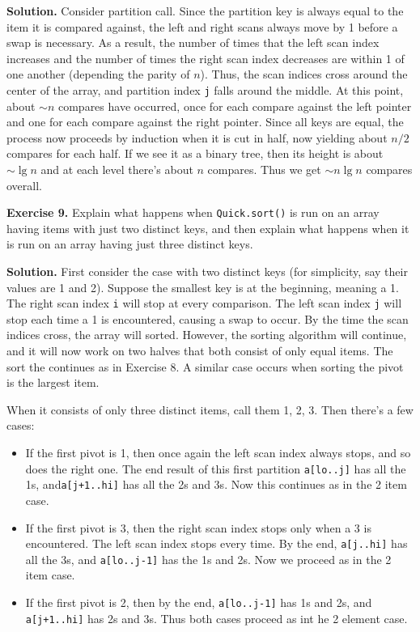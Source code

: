 \documentclass[12pt, a4paper]{article}
\newenvironment{ex}[2][Exercise]
{\par\medskip\noindent \textbf{#1 #2.}}
{\medskip}
\newenvironment{sol}[1][Solution]
{\par\medskip\noindent \textbf{#1.} }
{\medskip}
\begin{document}
	\begin{sol}
		Consider partition call. Since the partition key is always equal to the item
		it is compared against, the left and right scans always move by 1 before
		a swap is necessary. As a result, the number of times that the left scan
		index increases and the number of times the right scan index decreases are
		within 1 of one another (depending the parity of $n$). Thus, the scan indices
		cross around the center of the array, and partition index \texttt{j} falls
		around the middle. At this point, about $\sim n$ compares have occurred,
		once for each compare against the left pointer and one for each compare
		against the right pointer. Since all keys are equal, the process now proceeds
		by induction when it is cut in half, now yielding about $n/2$ compares for
		each half. If we see it as a binary tree, then its height is about $\sim \lg n$
		and at each level there's about $n$  compares. Thus we get $\sim n\lg n$
		compares overall.
	\end{sol}
	\begin{ex}{9}
		Explain what happens when \texttt{Quick.sort()} is run on an array having items
		with just two distinct keys, and then explain what happens when it is run on an
		array having just three distinct keys.
	\end{ex}
	\begin{sol}
		First consider the case with two distinct keys (for simplicity, say their values
		are 1 and 2). Suppose the smallest key is at the beginning, meaning a 1. The right
		scan index \texttt{i} will stop at every comparison. The left scan index \texttt{j}
		will stop each time a 1 is encountered, causing a swap to occur. By the time the 
		scan indices cross, the array will sorted. However, the sorting algorithm will
		continue, and it will now work on two halves that both consist of only equal
		items. The sort the continues as in Exercise 8. A similar case occurs when
		sorting the pivot is the largest item.
		
		When it consists of only three distinct items, call them 1, 2, 3. Then
		there's a few cases:
		\begin{itemize}
			\item If the first pivot is 1, then once again the left scan index always stops,
			and so does the right one. The end result of this first partition
			\texttt{a[lo..j]} has all the 1s, and\texttt{a[j+1..hi]} has all the 2s
			and 3s. Now this continues as in the 2 item case.
			\item If the first pivot is 3, then the right scan index stops only
			when a 3 is encountered. The left scan index stops every time. By
			the end, \texttt{a[j..hi]} has all the 3s,  and \texttt{a[lo..j-1]}
			has the 1s and 2s. Now we proceed as in the 2 item case.
			\item If the first pivot is 2, then by the end, \texttt{a[lo..j-1]}
			has 1s and 2s, and \texttt{a[j+1..hi]} has 2s and 3s. Thus both cases
			proceed as int he 2 element case.
		\end{itemize}
	\end{sol}
	\pagebreak
	\printbibliography
\end{document}

